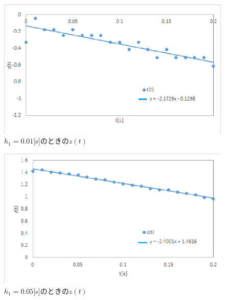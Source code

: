 \documentclass[11pt,a4paper]{jsarticle}
\begin{document}
\newpage

\begin{figure}[hbp]
 \begin{center}
  \includegraphics[scale = 1]{./picture/graph1.eps}
 \end{center}
 \caption{$h_1 = 0.01$[s]のときの$z(t)$}
 \label{fig3}
\end{figure}

\begin{figure}[hbp]
 \begin{center}
  \includegraphics[scale = 1]{./picture/graph2.eps}
 \end{center}
 \caption{$h_1 = 0.05$[s]のときの$z(t)$}
 \label{fig4}
\end{figure}
\end{document}
